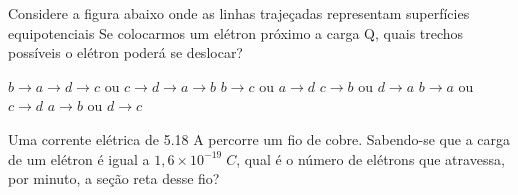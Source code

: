 \documentclass[12pt, addpoints]{exam}
\begin{document}
    \begin{questions}
\begin{multicols*}{2}
\question Considere a figura abaixo onde as linhas trajeçadas representam superfícies equipotenciais Se colocarmos um elétron próximo a carga Q, quais trechos possíveis o elétron poderá se deslocar?
        
        \begin{center}
            \begin{minipage}[c]{0.5\linewidth}
            \end{minipage}
        \end{center}
        
        

\begin{choices}
\choice $b\rightarrow a\rightarrow d\rightarrow c$ ou $c\rightarrow d\rightarrow a\rightarrow b$ 
\choice $b\rightarrow c$ ou $a\rightarrow d$ 
\choice $c\rightarrow b$ ou $d\rightarrow a$ 
\choice $b\rightarrow a$ ou $c\rightarrow d$ 
\choice $a\rightarrow b$ ou $d\rightarrow c$ 
\end{choices}
\question Uma corrente elétrica de    5.18 A percorre um ﬁo de cobre. Sabendo-se que a carga de um elétron é igual a $1,6\times 10^{-19}\;C$, qual é o número de elétrons que atravessa, por minuto, a seção reta desse ﬁo?


\end{multicols*}
\end{questions}
\end{document}
